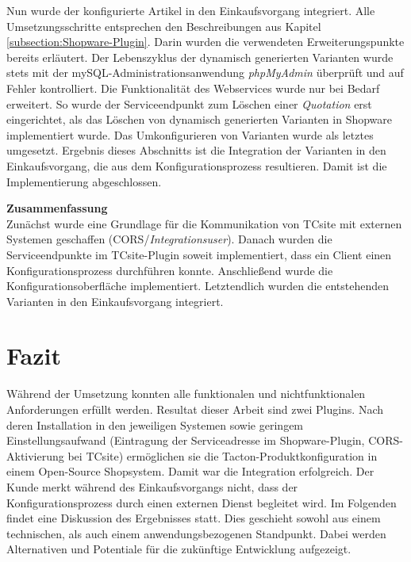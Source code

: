 \documentclass[11pt, a4paper, titlepage, listof=totoc, bibliography=totoc, index=totoc, twoside, openright, headings=normal]{scrreprt}
\begin{document}
Nun wurde der konfigurierte Artikel in den Einkaufsvorgang integriert. Alle  Umsetzungsschritte entsprechen den Beschreibungen aus Kapitel \ref{subsection:Shopware-Plugin}. Darin wurden die verwendeten Erweiterungspunkte bereits erläutert. Der Lebenszyklus der dynamisch generierten Varianten wurde stets mit der mySQL-Administrationsanwendung \emph{phpMyAdmin} überprüft und auf Fehler kontrolliert. Die Funktionalität des Webservices wurde nur bei Bedarf erweitert. So wurde der Serviceendpunkt zum Löschen einer \emph{Quotation} erst eingerichtet, als das Löschen von dynamisch generierten Varianten in Shopware implementiert wurde. Das Umkonfigurieren von Varianten wurde als letztes umgesetzt. Ergebnis dieses Abschnitts ist die Integration der Varianten in den Einkaufsvorgang, die aus dem Konfigurationsprozess resultieren. Damit ist die Implementierung abgeschlossen.

\textbf{Zusammenfassung}\\
Zunächst wurde eine Grundlage für die Kommunikation von TCsite mit externen Systemen geschaffen (CORS/\emph{Integrationsuser}). Danach wurden die Serviceendpunkte im TCsite-Plugin soweit implementiert, dass ein Client einen Konfigurationsprozess durchführen konnte. Anschließend wurde die Konfigurationsoberfläche implementiert. Letztendlich wurden die entstehenden Varianten in den Einkaufsvorgang integriert.

\pagebreak

\section{Fazit}
\label{section:Fazit}
Während der Umsetzung konnten alle funktionalen und nichtfunktionalen Anforderungen erfüllt werden. Resultat dieser Arbeit sind zwei Plugins. Nach deren Installation in den jeweiligen Systemen sowie geringem Einstellungsaufwand (Eintragung der Serviceadresse im Shopware-Plugin, CORS-Aktivierung bei TCsite) ermöglichen sie die Tacton-Produktkonfiguration in einem Open-Source Shopsystem. Damit war die Integration erfolgreich. Der Kunde merkt während des Einkaufsvorgangs nicht, dass der Konfigurationsprozess durch einen externen Dienst begleitet wird. Im Folgenden findet eine Diskussion des Ergebnisses statt. Dies geschieht sowohl aus einem technischen, als auch einem anwendungsbezogenen Standpunkt. Dabei werden Alternativen und Potentiale für die zukünftige Entwicklung aufgezeigt.
\end{document}
